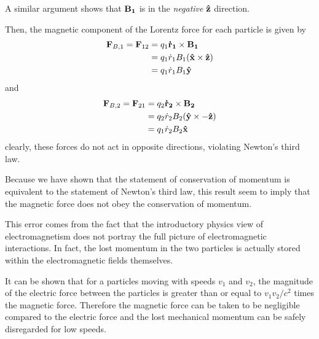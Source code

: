A similar argument shows that $\mathbf{B_1}$ is in the \textit{negative} $\mathbf{\hat{z}}$ direction. 

Then, the magnetic component of the Lorentz force for each particle is given by
\begin{align*}
    \mathbf{F}_{B,1} = \mathbf{F}_{12} &= q_1\mathbf{\dot r_1}\times \mathbf{B_1}\\
    &= q_1\dot r_1 B_1 (\mathbf{\hat{x}} \times \mathbf{\hat{z}}) \\
    &= q_1\dot r_1B_1 \mathbf{\hat{y}}
\end{align*}
and
\begin{align*}
    \mathbf{F}_{B,2} = \mathbf{F}_{21} &= q_2\mathbf{\dot r_2}\times \mathbf{B_2}\\
    &= q_2\dot r_2 B_2 (\mathbf{\hat{y}} \times -\mathbf{\hat{z}}) \\
    &= q_1\dot r_2B_2 \mathbf{\hat{x}} 
\end{align*}
clearly, these forces do not act in opposite directions, violating Newton's third law.

Because we have shown that the statement of conservation of momentum is equivalent to the statement of Newton's third law, this result seem to imply that the magnetic force does not obey the conservation of momentum.

This error comes from the fact that the introductory physics view of electromagnetism does not portray the full picture of electromagnetic interactions. In fact, the lost momentum in the two particles is actually stored within the electromagnetic fields themselves.

It can be shown that for a particles moving with speeds $v_1$ and $v_2$, the magnitude of the electric force between the particles is greater than or equal to $v_1v_2/c^2$ times the magnetic force. Therefore the magnetic force can be taken to be negligible compared to the electric force and the lost mechanical momentum can be safely disregarded for low speeds.

